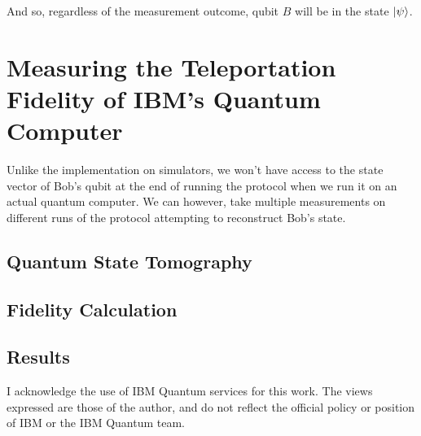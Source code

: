 \documentclass[prx,twocolumn]{revtex4-2}
\numberwithin{equation}{section}
\numberwithin{figure}{section}
\numberwithin{table}{section}
\begin{document}
And so, regardless of the measurement outcome, qubit $B$ will be in the state $\ket\psi$. 

\section{Measuring the Teleportation Fidelity of IBM's Quantum Computer}
Unlike the implementation on simulators, we won't have access to the state vector of Bob's qubit at the end 
of running the protocol when we run it on an actual quantum computer. We can however, take multiple 
measurements on different runs of the protocol attempting to reconstruct Bob's state.
\subsection{Quantum State Tomography}
\subsection{Fidelity Calculation}
\subsection{Results}

\nocite{ibm-quantum}

\begin{acknowledgments}
    I acknowledge the use of IBM Quantum services for this work. The views expressed are those of the author, 
    and do not reflect the official policy or position of IBM or the IBM Quantum team.
\end{acknowledgments}


\end{document}
